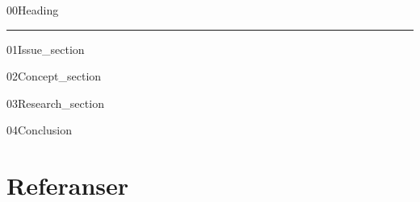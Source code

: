\documentclass[a4paper,11pt,norsk]{article}
\begin{document}
{00Heading}

\setlength{\parskip}{0ex}
\renewcommand{\baselinestretch}{0.1}\normalsize
\tableofcontents
\renewcommand{\baselinestretch}{1.00}\normalsize
\setlength{\parskip}{2ex}
\rule{\textwidth}{1pt}


\newpage
{01Issue_section}

\newpage
{02Concept_section}

\newpage
{03Research_section}

\newpage
{04Conclusion}


\newpage
\section{Referanser}
\label{sec:References}
\printbibliography{}
\end{document}
